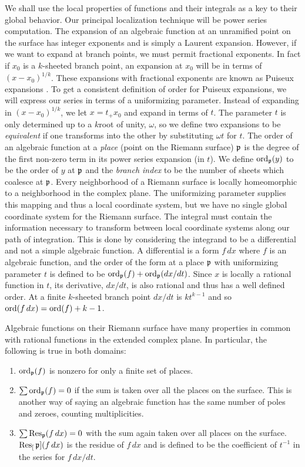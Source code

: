 We shall use the local properties of functions
and their integrals as a key to their global behavior.  Our
principal localization technique will be power series computation.
The expansion of an algebraic function at an unramified point on
the surface has integer exponents and is simply a Laurent expansion.
However, if we want to expand at branch points, we must permit
fractional exponents.  In fact if $x_0$ is a $k$-sheeted branch point,
an expansion at $x_0$ will be in terms of $(x-x_0)^{1/k}$.  These
expansions with fractional exponents are known as Puiseux expansions
\cite{Bliss1933-ax}. To get a consistent definition of order for
Puiseux expansions, we will express our series in terms of a
uniformizing parameter.  Instead of expanding in $(x-x_0)^{1/k}$, we
let $x = t_+x_0$ and expand in terms of $t$.  The parameter $t$ is
only determined up to a $k$\th root of unity, $\omega$, so we define
two expansions to be {\em equivalent} if one transforms into the other
by substituting $\omega t$ for $t$.  The order of an algebraic
function at a {\em place} (point on the Riemann surface) ${\mathfrak p}$ is
the degree of the first non-zero term in its power series expansion
(in $t$).  We define $\mathop{\rm ord}\nolimits_{{\mathfrak p}}(y)$ to be the order of $y$ at
${\mathfrak p}$ and the {\em branch index} to be the number of sheets which
coalesce at ${\mathfrak p}$.  Every neighborhood of a Riemann surface is
locally homeomorphic to a neighborhood in the complex plane. The
uniformizing parameter supplies this mapping and thus a local
coordinate system, but we have no single global coordinate system for
the Riemann surface.  The integral must contain the information
necessary to transform between local coordinate systems along our path
of integration.  This is done by considering the integrand to be a
differential and not a simple algebraic function.  A differential is a
form $f\,dx$ where $f$ is an algebraic function, and the order of the
form at a place ${\mathfrak p}$ with uniformizing parameter $t$ is defined to
be $\mathop{\rm ord}\nolimits_{{\mathfrak p}}(f) + \mathop{\rm ord}\nolimits_{{\mathfrak p}}(dx/dt)$.  Since $x$ is locally a
rational function in $t$, its derivative, $dx/dt$, is also rational
and thus has a well defined order.  At a finite $k$-sheeted branch
point $dx/dt$ is $kt^{k-1}$ and so $\mathop{\rm ord}\nolimits(f\,dx)=\mathop{\rm ord}\nolimits(f)+k-1$.

Algebraic functions on their Riemann surface have
many properties in common with rational functions in the
extended complex plane.  In particular, the following is true
in both domains:

\begin{enumerate}
\item $\mathop{\rm ord}\nolimits_{{\mathfrak p}}(f)$  is nonzero for only a finite set of places. 

\item $\sum \mathop{\rm ord}\nolimits_{{\mathfrak p}}(f) = 0$ if the sum is taken over all the
places on the surface.  This is another way of saying an algebraic
function has the same number of poles and zeroes, counting multiplicities.

\item  $\sum \mathop{\rm Res}\nolimits_{{\mathfrak p}}(f\,dx) = 0$ with the sum again taken over
all places on the surface.  $\mathop{\rm Res}\nolimits_[{\mathfrak p}](f\,dx)$ is the residue of $f\,dx$
and is defined to be the coefficient of $t^{-1}$ in the series
for $f\,dx/dt$.
\end{enumerate}

